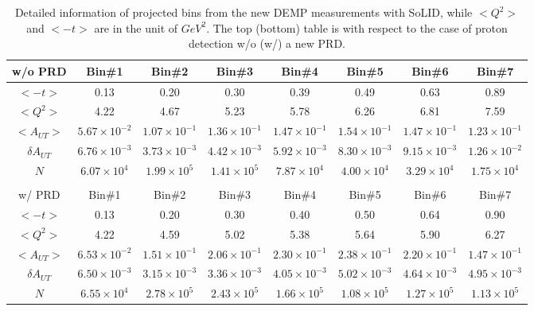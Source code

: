 	\begin{table}[!ht]
	\centering
	\begin{tabular}{|c|c|c|c|c|c|c|c|}
	  \hline
	w/o PRD   &  Bin\#1 & Bin\#2 & Bin\#3 & Bin\#4 & Bin\#5 & Bin\#6 & Bin\#7 \\
	\hline 
	    $<-t>$                &  0.13 & 0.20   & 0.30   & 0.39   & 0.49   & 0.63   & 0.89  \\
	   $<Q^{2}>$          & 4.22  & 4.67   & 5.23   & 5.78   & 6.26   & 6.81  & 7.59  \\
	   $<A_{UT}>$        &$5.67\times 10^{-2}$   & $1.07\times 10^{-1}$   & $1.36\times 10^{-1}$    & $1.47\times 10^{-1}$    & $1.54\times 10^{-1}$    & $1.47\times 10^{-1}$   & $1.23\times 10^{-1}$   \\
	   $\delta A_{UT}$  &  $6.76\times 10^{-3}$   & $3.73\times 10^{-3}$    &   $4.42\times 10^{-3}$  &  $5.92\times 10^{-3}$   &  $8.30\times 10^{-3}$   &   $9.15\times 10^{-3}$ &   $1.26\times 10^{-2}$ \\
	   $N$                     & $6.07\times 10^{4}$   &$1.99\times 10^{5}$   & $1.41\times 10^{5}$   &  $7.87\times 10^{4}$  & $4.00\times 10^{4}$  &  $3.29\times 10^{4}$ &$1.75\times 10^{4}$  \\
	 \hline
			\multicolumn{3}{c}{ } \\
   	\hline 
	w/ PRD   &  Bin\#1 & Bin\#2 & Bin\#3 & Bin\#4 & Bin\#5 & Bin\#6 & Bin\#7 \\
	 \hline
	  $<-t>$                &  0.13 & 0.20   & 0.30   & 0.40   & 0.50   & 0.64   & 0.90  \\
	   $<Q^{2}>$          & 4.22  & 4.59   & 5.02   & 5.38   & 5.64   & 5.90  & 6.27  \\
	   $<A_{UT}>$        &$6.53\times 10^{-2}$   & $1.51\times 10^{-1}$   & $2.06\times 10^{-1}$    & $2.30\times 10^{-1}$    & $2.38\times 10^{-1}$    & $2.20\times 10^{-1}$   & $1.47\times 10^{-1}$   \\
	   $\delta A_{UT}$  &  $6.50\times 10^{-3}$   & $3.15\times 10^{-3}$    &   $3.36\times 10^{-3}$  &  $4.05\times 10^{-3}$   &  $5.02\times 10^{-3}$   &   $4.64\times 10^{-3}$ &   $4.95\times 10^{-3}$ \\
	   $N$                     & $6.55\times 10^{4}$   &$2.78\times 10^{5}$   & $2.43\times 10^{5}$   &  $1.66\times 10^{5}$  & $1.08\times 10^{5}$  &  $1.27\times 10^{5}$ &$1.13\times 10^{5}$  \\
	 \hline
	\end{tabular}
	\caption[Detailed information of projected bins]{\footnotesize{Detailed information of projected bins from the new DEMP measurements with SoLID, while $<Q^{2}>$ and $<-t>$ are in the unit of $GeV^{2}$. The top (bottom) table is with respect to the case of proton detection w/o (w/) a new PRD.}}
	\label{asym_bin_table}
\end{table} 

